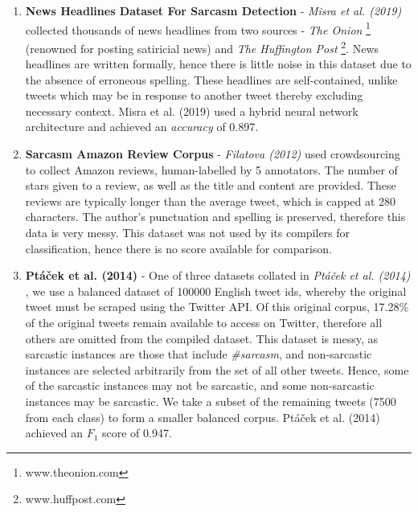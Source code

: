 \documentclass[12pt,a4paper]{article}
\begin{document}
\begin{enumerate}[leftmargin=0cm]
	\item \textbf{News Headlines Dataset For Sarcasm Detection} - \textit{Misra et al. (2019)} \cite{misra2019sarcasm} collected thousands of news headlines from two sources - \textit{The Onion} \footnote{www.theonion.com} (renowned for posting satiricial news) and \textit{The Huffington Post} \footnote{www.huffpost.com}. News headlines are written formally, hence there is little noise in this dataset due to the absence of erroneous spelling. These headlines are self-contained, unlike tweets which may be in response to another tweet thereby excluding necessary context. Misra et al. (2019) \cite{misra2019sarcasm} used a hybrid neural network architecture and achieved an \textit{accuracy} of 0.897.\vspace{-4.2pt}
	
	
	\item \textbf{Sarcasm Amazon Review Corpus} - \textit{Filatova (2012)} \cite{filatova2012irony} used crowdsourcing to collect Amazon reviews, human-labelled by 5 annotators. The number of stars given to a review, as well as the title and content are provided. These reviews are typically longer than the average tweet, which is capped at 280 characters. The author's punctuation and spelling is preserved, therefore this data is very messy. This dataset was not used by its compilers for classification, hence there is no score available for comparison.\vspace{-4.2pt}
	
	\item \textbf{Pt\'a\v{c}ek et al. (2014)} - One of three datasets collated in \textit{Pt\'a\v{c}ek et al. (2014)} \cite{ptavcek2014sarcasm}, we use a balanced dataset of 100000 English tweet ids, whereby the original tweet must be scraped using the Twitter API. Of this original corpus, 17.28\% of the original tweets remain available to access on Twitter, therefore all others are omitted from the compiled dataset. This dataset is messy, as sarcastic instances are those that include \textit{\#sarcasm}, and non-sarcastic instances are selected arbitrarily from the set of all other tweets. Hence, some of the sarcastic instances may not be sarcastic, and some non-sarcastic instances may be sarcastic. We take a subset of the remaining tweets (7500 from each class) to form a smaller balanced corpus. Pt\'a\v{c}ek et al. (2014) \cite{ptavcek2014sarcasm} achieved an $F_{1}$ score of 0.947.
\end{enumerate}
\end{document}
